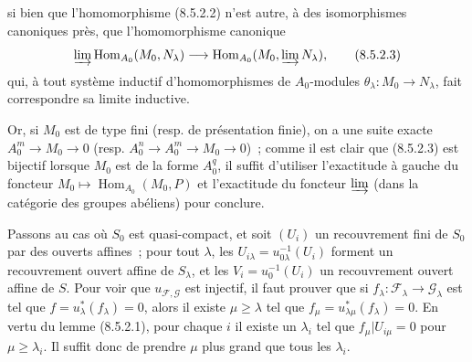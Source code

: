   si bien que l'homomorphisme (8.5.2.2) n'est autre, à des isomorphismes
  canoniques près, que l'homomorphisme canonique
  \begin{equation}
    \varinjlim\operatorname{Hom}_{A_0}(M_0,N_\lambda)
    \longrightarrow
    \operatorname{Hom}_{A_0}(M_0,\varinjlim N_\lambda),
    \tag{8.5.2.3}\label{IV.8.5.2.3-fr}
  \end{equation}
  qui, à tout système inductif d'homomorphismes de $A_0$-modules
  $\theta_\lambda:M_0\to N_\lambda$, fait correspondre sa limite inductive.

  Or, si $M_0$ est de type fini (resp. de présentation finie), on a une suite
  exacte $A_0^m\to M_0\to0$ (resp. $A_0^n\to A_0^m\to M_0\to0$)~; comme il est
  clair que (8.5.2.3) est bijectif lorsque $M_0$ est de la forme $A_0^q$, il
  suffit d'utiliser l'exactitude à gauche du foncteur
  $M_0\mapsto\operatorname{Hom}_{A_0}(M_0,P)$ et l'exactitude du foncteur
  $\varinjlim$ (dans la catégorie des groupes abéliens) pour conclure.

  Passons au cas où $S_0$ est quasi-compact, et soit $(U_i)$ un recouvrement
  fini de $S_0$ par des ouverts affines~; pour tout $\lambda$, les
  $U_{i\lambda}=u_{0\lambda}^{-1}(U_i)$ forment un recouvrement ouvert affine de
  $S_\lambda$, et les $V_i=u_0^{-1}(U_i)$ un recouvrement ouvert affine de $S$.
  Pour voir que $u_{\mathcal F,\mathcal G}$ est injectif, il faut prouver que
  si $f_\lambda:\mathcal F_\lambda\to\mathcal G_\lambda$ est tel que
  $f=u_\lambda^*(f_\lambda)=0$, alors il existe $\mu\geq\lambda$ tel que
  $f_\mu=u_{\lambda\mu}^*(f_\lambda)=0$. En vertu du lemme (8.5.2.1), pour
  chaque $i$ il existe un $\lambda_i$ tel que
  $f_\mu|U_{i\mu}=0$ pour $\mu\geq\lambda_i$. Il suffit donc de prendre $\mu$
  plus grand que tous les $\lambda_i$.

